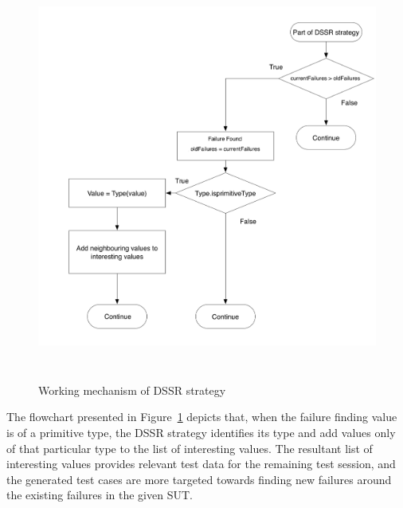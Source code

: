 \begin{figure}[h]
\centering
\includegraphics[width=12cm, height=13.5cm]{chapter4/flowchart1.png}
\bigskip
\caption{Working mechanism of DSSR strategy}
\label{fig:Working_DSSS}
\end{figure}
\bigskip

The flowchart presented in Figure~\ref{fig:Working_DSSS} depicts that, when the failure finding value is of a primitive type, the DSSR strategy identifies its type and add values only of that particular type to the list of interesting values. The resultant list of interesting values provides relevant test data for the remaining test session, and the generated test cases are more targeted towards finding new failures around the existing failures in the given SUT.

